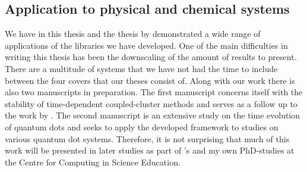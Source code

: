         \subsection{Application to physical and chemical systems}
            We have in this thesis and the thesis by \citeauthor{greg-winther}
            \cite{greg-winther} demonstrated a wide range of applications of the
            libraries we have developed.
            One of the main difficulties in writing this thesis has been the
            downscaling of the amount of results to present.
            There are a multitude of systems that we have not had the time to
            include between the four covers that our theses consist of.
            Along with our work there is also two manuscripts in preparation.
            The first manuscript concerns itself with the stability of
            time-dependent coupled-cluster methods \cite{oa-stability} and
            serves as a follow up to the work by
            \citeauthor{pedersen2018symplectic} \cite{pedersen2018symplectic}.
            The second manuscript is an extensive study on the time evolution of
            quantum dots \cite{td-quantum-dots} and seeks to apply the developed
            framework to studies on various quantum dot systems.
            Therefore, it is not surprising that much of this work will be
            presented in later studies as part of \citeauthor{greg-winther}'s
            and my own PhD-studies at the Centre for Computing in Science
            Education.

